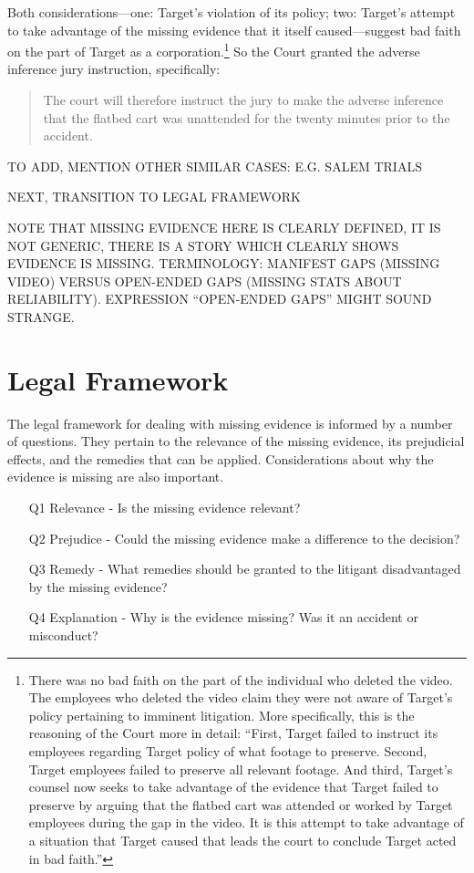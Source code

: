 \documentclass[
  10pt,
  dvipsnames,enabledeprecatedfontcommands]{scrartcl}
\begin{document}
\noindent Both considerations---one: Target's violation of its policy;
two: Target's attempt to take advantage of the missing evidence that it
itself caused---suggest bad faith on the part of Target as a
corporation.\footnote{There was no bad faith on the part of the
  individual who deleted the video. The employees who deleted the video
  claim they were not aware of Target's policy pertaining to imminent
  litigation. More specifically, this is the reasoning of the Court more
  in detail: ``First, Target failed to instruct its employees regarding
  Target policy of what footage to preserve. Second, Target employees
  failed to preserve all relevant footage. And third, Target's counsel
  now seeks to take advantage of the evidence that Target failed to
  preserve by arguing that the flatbed cart was attended or worked by
  Target employees during the gap in the video. It is this attempt to
  take advantage of a situation that Target caused that leads the court
  to conclude Target acted in bad faith.''} So the Court granted the
adverse inference jury instruction, specifically:

\begin{quote}
The court will therefore instruct the jury to make the adverse inference that the flatbed cart was unattended for the twenty minutes prior to the accident.
\end{quote}

TO ADD, MENTION OTHER SIMILAR CASES: E.G. SALEM TRIALS

NEXT, TRANSITION TO LEGAL FRAMEWORK

NOTE THAT MISSING EVIDENCE HERE IS CLEARLY DEFINED, IT IS NOT GENERIC,
THERE IS A STORY WHICH CLEARLY SHOWS EVIDENCE IS MISSING. TERMINOLOGY:
MANIFEST GAPS (MISSING VIDEO) VERSUS OPEN-ENDED GAPS (MISSING STATS
ABOUT RELIABILITY). EXPRESSION ``OPEN-ENDED GAPS'' MIGHT SOUND STRANGE.

\hypertarget{legal-framework}{%
\section{Legal Framework}\label{legal-framework}}

The legal framework for dealing with missing evidence is informed by a
number of questions. They pertain to the relevance of the missing
evidence, its prejudicial effects, and the remedies that can be applied.
Considerations about why the evidence is missing are also important.

\begin{itemize}
\item[Q1] Relevance - Is the missing evidence relevant?
\item[Q2] Prejudice - Could the missing evidence make a difference to the decision?
\item[Q3] Remedy - What remedies should be granted to the litigant disadvantaged 
by the missing evidence?
\item[Q4] Explanation - Why is the evidence missing? Was it an accident or  misconduct?
\end{itemize}
\end{document}

